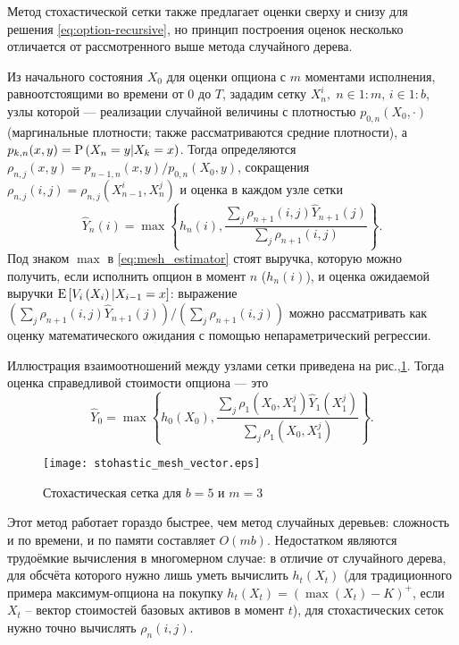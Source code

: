Метод стохастической сетки \cite{Broadie2004,Kashtanov2015} также предлагает оценки сверху и снизу для решения \eqref{eq:option-recursive}, но принцип построения оценок несколько отличается от рассмотренного выше метода случайного дерева.

Из начального состояния $X_0$ для оценки опциона с $m$ моментами исполнения, равноотстоящими во времени от 0 до $T$, зададим сетку $X_n^i,\; n\in 1\mathbin{:}m,\, i \in 1\mathbin{:}b$, узлы которой --- реализации случайной величины с плотностью $p_{0, n}(X_0, \cdot)$ (маргинальные плотности; также рассматриваются средние плотности), а $p_{k, n}(x, y) = \mathrm{P}\left(X_n = y \middle\vert X_k = x\right)$. Тогда определяются $\rho_{n, j}(x, y) = p_{n-1, n}(x, y) / p_{0, n}(X_0, y)$, сокращения $\rho_{n, j}(i, j) = \rho_{n, j}(X_{n-1}^i, X_n^j)$ и оценка в каждом узле сетки
\begin{equation}\label{eq:mesh_estimator}
\hat Y_n(i) = \max\left\lbrace h_n(i), \frac{\sum_j \rho_{n+1}(i, j) \hat Y_{n+1}(j)}{\sum_j \rho_{n+1}(i, j)} \right\rbrace.
\end{equation}
Под знаком $\max$ в \eqref{eq:mesh_estimator} стоят выручка, которую можно получить, если исполнить опцион в момент $n$ ($h_n(i)$), и оценка ожидаемой выручки $\mathrm{E}\left[V_i\left(X_i\right)|X_{i-1}=x\right]$: выражение $\left(\sum_j \rho_{n+1}(i, j) \hat Y_{n+1}(j)\right) / \left(\sum_j \rho_{n+1}(i, j)\right)$ можно рассматривать как оценку математического ожидания с помощью непараметрический регрессии.

Иллюстрация взаимоотношений между узлами сетки приведена на рис.,\ref{fig:stochastic_mesh}. Тогда оценка справедливой стоимости опциона --- это $$\hat Y_0 = \max\left\lbrace h_0(X_0), \frac{\sum_j \rho_{1}(X_0, X_1^j) \hat Y_{1}(X_1^j)}{\sum_j \rho_{1}(X_0, X_1^j)} \right\rbrace.$$

\begin{figure}[t]
    \centering
    \texttt{[image: stohastic\_mesh\_vector.eps]}
    \caption{Стохастическая сетка для $b = 5$ и $m = 3$}
    \label{fig:stochastic_mesh}
\end{figure}

Этот метод работает гораздо быстрее, чем метод случайных деревьев: сложность и по времени, и по памяти составляет $O(mb)$. Недостатком являются трудоёмкие вычисления в многомерном случае: в отличие от случайного дерева, для обсчёта которого нужно лишь уметь вычислить $h_t(X_t)$ (для традиционного примера максимум-опциона на покупку $h_t(X_t) = \left(\max(X_t) - K\right)^+$, если $X_t$ -- вектор стоимостей базовых активов в момент $t$), для стохастических сеток нужно точно вычислять $\rho_n(i, j)$.

